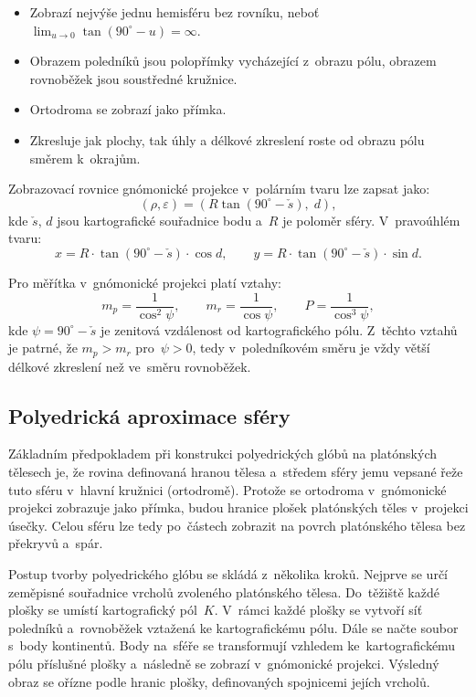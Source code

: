\documentclass[11pt, a4paper]{article}
\begin{document}
\begin{itemize}
    \item Zobrazí nejvýše jednu hemisféru bez rovníku, neboť $\lim_{u \to 0} \tan(90^{\circ} - u) = \infty$.
    \item Obrazem poledníků jsou polopřímky vycházející z~obrazu pólu, obrazem rovnoběžek jsou soustředné kružnice.
    \item Ortodroma se zobrazí jako přímka.
    \item Zkresluje jak plochy, tak úhly a délkové zkreslení roste od obrazu pólu směrem k~okrajům.
\end{itemize}

Zobrazovací rovnice gnómonické projekce v~polárním tvaru lze zapsat jako:
\begin{equation}
    (\rho, \varepsilon) = (R \tan(90^{\circ} - \check{s}), \; d),
\end{equation}
kde $\check{s}$, $d$ jsou kartografické souřadnice bodu a~$R$ je poloměr sféry. V~pravoúhlém tvaru:
\begin{equation}
    x = R \cdot \tan(90^{\circ} - \check{s}) \cdot \cos d, \qquad
    y = R \cdot \tan(90^{\circ} - \check{s}) \cdot \sin d.
\end{equation}

Pro měřítka v~gnómonické projekci platí vztahy:
\begin{equation}
    m_p = \frac{1}{\cos^2 \psi}, \qquad m_r = \frac{1}{\cos \psi}, \qquad P = \frac{1}{\cos^3 \psi},
\end{equation}
kde $\psi = 90^{\circ} - \check{s}$ je zenitová vzdálenost od kartografického pólu. Z~těchto vztahů je patrné, že $m_p > m_r$ pro~$\psi > 0$, tedy v~poledníkovém směru je vždy větší délkové zkreslení než ve~směru rovnoběžek.

\subsection{Polyedrická aproximace sféry}

Základním předpokladem při konstrukci polyedrických glóbů na platónských tělesech je, že rovina definovaná hranou tělesa a~středem sféry jemu vepsané řeže tuto sféru v~hlavní kružnici (ortodromě). Protože se ortodroma v~gnómonické projekci zobrazuje jako přímka, budou hranice plošek platónských těles v~projekci úsečky. Celou sféru lze tedy po~částech zobrazit na povrch platónského tělesa bez překryvů a~spár.

Postup tvorby polyedrického glóbu se skládá z~několika kroků. Nejprve se určí zeměpisné souřadnice vrcholů zvoleného platónského tělesa. Do~těžiště každé plošky se umístí kartografický pól~$K$. V~rámci každé plošky se vytvoří síť poledníků a~rovnoběžek vztažená ke kartografickému pólu. Dále se načte soubor s~body kontinentů. Body na~sféře se transformují vzhledem ke~kartografickému pólu příslušné plošky a~následně se zobrazí v~gnómonické projekci. Výsledný obraz se ořízne podle hranic plošky, definovaných spojnicemi jejích vrcholů.
\end{document}

